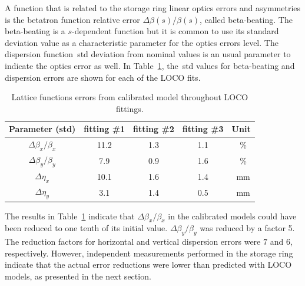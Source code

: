 A function that is related to the storage ring linear optics errors and asymmetries is the betatron function relative error $\Delta \beta(s)/\beta(s)$, called beta-beating. The beta-beating is a $s$-dependent function but it is common to use its standard deviation value as a characteristic parameter for the optics errors level. The dispersion function~\gls{std} deviation from nominal values is an usual parameter to indicate the optics error as well. In Table~\ref{tab:calibrated_optics}, the~\gls{std} values for beta-beating and dispersion errors are shown for each of the LOCO fits.
\begin{table}
    \centering
    \caption{Lattice functions errors from calibrated model throughout LOCO fittings.}
    \label{tab:calibrated_optics}
    \begin{tabular}{ccccc}
        \toprule\toprule
        Parameter (std) & fitting \#1 & fitting \#2 & fitting \#3 & Unit \\
        \hline
        $\Delta\beta_x/\beta_x$ & \num{11.2} & \num{1.3} & \num{1.1} &\SI{}{\%}  \\
        $\Delta\beta_y/\beta_y$ & \num{7.9} & \num{0.9} & \num{1.6} &\SI{}{\%} \\
        $\Delta\eta_x$ &  \num{10.1} &  \num{1.6} & \num{1.4} & \SI{}{\milli\meter}  \\
        $\Delta\eta_y$ &  \num{3.1} &  \num{1.4} & \num{0.5} & \SI{}{\milli\meter} \\
        \bottomrule\bottomrule
    \end{tabular}
\end{table}

The results in Table~\ref{tab:calibrated_optics} indicate that $\Delta\beta_x/\beta_x$ in the calibrated models could have been reduced to one tenth of its initial value. $\Delta\beta_y/\beta_y$ was reduced by a factor 5. The reduction factors for horizontal and vertical dispersion errors were $7$ and $6$, respectively. However, independent measurements performed in the storage ring indicate that the actual error reductions were lower than predicted with LOCO models, as presented in the next section. 

